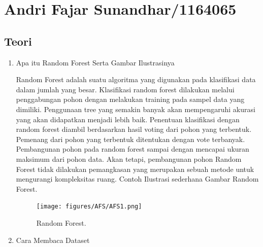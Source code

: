 \section{Andri Fajar Sunandhar/1164065}
\subsection{Teori}
\begin{enumerate}
\item Apa itu Random Forest Serta Gambar Ilustrasinya \par
Random Forest adalah suatu algoritma yang digunakan pada klasifikasi data dalam jumlah yang besar. Klasifikasi random forest dilakukan melalui penggabungan pohon  dengan melakukan training pada sampel data yang dimiliki. Penggunaan tree yang semakin banyak akan mempengaruhi akurasi yang akan didapatkan menjadi lebih baik. Penentuan klasifikasi dengan random forest diambil berdasarkan hasil voting dari pohon yang terbentuk. Pemenang dari pohon yang terbentuk ditentukan dengan vote terbanyak. Pembangunan pohon  pada random forest sampai dengan mencapai ukuran maksimum dari pohon data. Akan tetapi, pembangunan pohon Random Forest tidak dilakukan pemangkasan  yang merupakan sebuah metode untuk mengurangi kompleksitas ruang. Contoh Ilustrasi sederhana Gambar Random Forest. 
		\begin{figure}[ht]
		\centerline{\texttt{[image: figures/AFS/AFS1.png]}}
		\caption{Random Forest.}
		\label{AFS1}
		\end{figure}

\item Cara Membaca Dataset
	


\end{enumerate}
